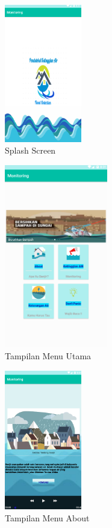 \begin{figure}[H]
        \centering
        \includegraphics[width=0.3\textwidth]{figures/satu.png}
        \caption{Splash Screen}
        \label{print}
        \end{figure}
\begin{figure}[H]
        \centering
        \includegraphics[width=0.4\textwidth]{figures/dua.png}
        \caption{Tampilan Menu Utama}
        \label{print}
        \end{figure}
\begin{figure}[H]
        \centering
        \includegraphics[width=0.3\textwidth]{figures/tiga.png}
        \caption{Tampilan Menu About}
        \label{print}
        \end{figure}

